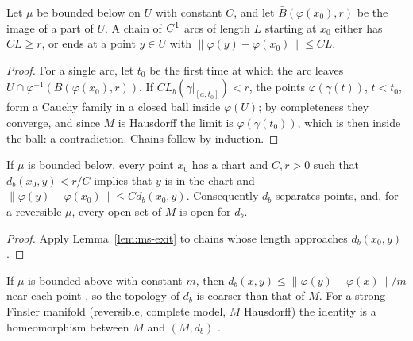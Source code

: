 \begin{lemma}
  \label{lem:ms-exit}
  \leanok
  Let $\mu$ be bounded below on $U$ with constant $C$, and let $\bar B(\varphi(x_0), r)$ be the
  image of a part of $U$. A chain of $C^{1}$ arcs of length $L$ starting at $x_0$ either has
  $C L \geq r$, or ends at a point $y \in U$ with $\|\varphi(y) - \varphi(x_0)\| \leq C L$.
\end{lemma}

\begin{proof}
  \leanok
  For a single arc, let $t_0$ be the first time at which the arc leaves
  $U \cap \varphi^{-1}(B(\varphi(x_0), r))$. If $C L_b(\gamma|_{[a, t_0]}) < r$, the points
  $\varphi(\gamma(t))$, $t < t_0$, form a Cauchy family in a closed ball inside $\varphi(U)$; by
  completeness they converge, and since $M$ is Hausdorff the limit is $\varphi(\gamma(t_0))$, which
  is then inside the ball: a contradiction. Chains follow by induction.
\end{proof}

\begin{theorem}
  \label{thm:ms-bounded-below}
  \leanok
  If $\mu$ is bounded below, every point $x_0$ has a chart and $C, r > 0$ such that
  $d_b(x_0, y) < r / C$ implies that $y$ is in the chart and
  $\|\varphi(y) - \varphi(x_0)\| \leq C d_b(x_0, y)$. Consequently $d_b$ separates points, and, for
  a reversible $\mu$, every open set of $M$ is open for $d_b$.
\end{theorem}

\begin{proof}
  \leanok
  Apply Lemma~\ref{lem:ms-exit} to chains whose length approaches $d_b(x_0, y)$.
\end{proof}

\begin{theorem}
  \label{thm:ms-bounded-above}
  \leanok
  If $\mu$ is bounded above with constant $m$, then $d_b(x, y) \leq \|\varphi(y) - \varphi(x)\| / m$
  near each point \cite[(9.3)]{Lar22}, so the topology of $d_b$ is coarser than that of $M$. For a
  strong Finsler manifold (reversible, complete model, $M$ Hausdorff) the identity is a
  homeomorphism between $M$ and $(M, d_b)$ \cite[Cor.~9.1.9]{Lar22}.
\end{theorem}

